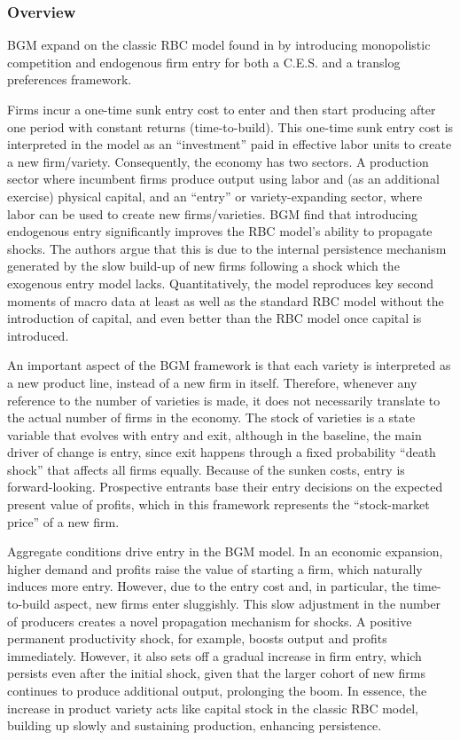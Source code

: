 \documentclass[a4paper,12pt]{article} %
\numberwithin{equation}{section} %
\numberwithin{figure}{section}
\numberwithin{table}{section}
\begin{document}
\subsubsection{Overview}
BGM expand on the classic RBC model found in \textcite{campbell1994inspecting} by introducing monopolistic competition and 
endogenous firm entry for both a C.E.S. and a translog preferences framework. 

Firms incur a one-time sunk entry cost to enter and then start producing after one period with constant returns (time-to-build). 
This one-time sunk entry cost is interpreted in the model as an ``investment'' paid in effective labor units to create a new firm/variety. Consequently, the economy has two sectors. 
A production sector where incumbent firms produce output using labor and (as an additional exercise) physical capital, and an ``entry'' or variety-expanding sector, 
where labor can be used to create new firms/varieties. BGM find that introducing endogenous entry significantly improves the RBC model's ability to propagate shocks. The authors argue that this is due to the internal 
persistence mechanism generated by the slow build-up of new firms following a shock which the exogenous entry model lacks. Quantitatively, the model reproduces key 
second moments of macro data at least as well as the standard RBC model without the introduction of capital, and even better than the RBC model once capital is introduced.

An important aspect of the BGM framework is that each variety is interpreted as a new product line, instead of a new firm in itself. 
Therefore, whenever any reference to the number of varieties is made, it does not necessarily translate to the actual number of firms in the economy. 
The stock of varieties is a state variable that evolves with entry and exit, although in the baseline, the main driver of change is entry, 
since exit happens through a fixed probability ``death shock'' that affects all firms equally. Because of the sunken costs, entry is forward-looking.
Prospective entrants base their entry decisions on the expected present value of profits, which in this framework represents the ``stock-market price'' of a new firm. 

Aggregate conditions drive entry in the BGM model. In an economic expansion, higher demand and profits raise the value of starting a firm, which naturally induces more entry. 
However, due to the entry cost and, in particular, the time-to-build aspect, new firms enter sluggishly. This slow adjustment in the number of producers creates a novel 
propagation mechanism for shocks. A positive permanent productivity shock, for example, boosts output and profits immediately. However, it also sets off a gradual increase in firm entry, 
which persists even after the initial shock, given that the larger cohort of new firms continues to produce additional output, prolonging the boom. In essence, the increase in 
product variety acts like capital stock in the classic RBC model, building up slowly and sustaining production, enhancing persistence. 
\end{document}
